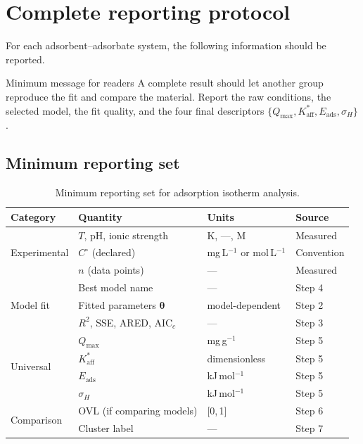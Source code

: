 \documentclass[journal=jacsat,manuscript=article]{achemso}
\begin{document}
\section{Complete reporting protocol}
\label{sec:si_protocol}

For each adsorbent--adsorbate system, the following information
should be reported.

\begin{bluebox}{Minimum message for readers}
	A complete result should let another group reproduce the fit and compare
	the material. Report the raw conditions, the selected model, the fit
	quality, and the four final descriptors
	\(\{Q_{\max},K_{\mathrm{aff}}^{\ast},E_{\mathrm{ads}},\sigma_H\}\).
\end{bluebox}

\subsection{Minimum reporting set}
\label{sec:si_reporting}

\begin{table}[H]
	\centering
	\small
	\caption{Minimum reporting set for adsorption isotherm analysis.}
	\label{tab:si_reporting}
	\renewcommand{\arraystretch}{1.3}
	\begin{tabular}{@{} l l l l @{}}
		\toprule
		\textbf{Category} & \textbf{Quantity} & \textbf{Units}
		& \textbf{Source} \\
		\midrule
		\multirow{3}{*}{Experimental}
		& $T$, pH, ionic strength & K, ---, M & Measured \\
		& $C^\circ$ (declared) & mg\,L$^{-1}$ or mol\,L$^{-1}$ & Convention \\
		& $n$ (data points) & --- & Measured \\
		\midrule
		\multirow{3}{*}{Model fit}
		& Best model name & --- & Step 4 \\
		& Fitted parameters $\boldsymbol{\theta}$ & model-dependent & Step 2 \\
		& $R^2$, SSE, ARED, AIC$_c$ & --- & Step 3 \\
		\midrule
		\multirow{4}{*}{Universal}
		& $Q_{\max}$ & mg\,g$^{-1}$ & Step 5 \\
		& $K_{\mathrm{aff}}^{\ast}$ & dimensionless & Step 5 \\
		& $E_{\mathrm{ads}}$ & kJ\,mol$^{-1}$ & Step 5 \\
		& $\sigma_H$ & kJ\,mol$^{-1}$ & Step 5 \\
		\midrule
		\multirow{2}{*}{Comparison}
		& OVL (if comparing models) & [0,\,1] & Step 6 \\
		& Cluster label & --- & Step 7 \\
		\bottomrule
	\end{tabular}
\end{table}
\end{document}
